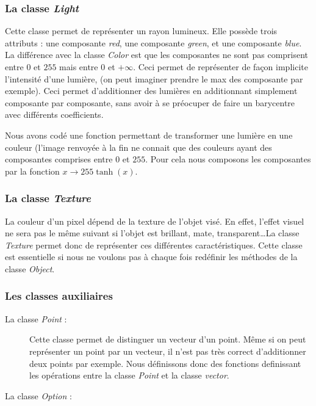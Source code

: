 \documentclass{article}
\begin{document}
\subsubsection{La classe \emph{Light}}
Cette classe permet de représenter un rayon lumineux. Elle possède trois attributs : une composante \emph{red}, une composante \emph{green}, et une composante \emph{blue}.
La différence avec la classe \emph{Color} est que les composantes ne sont pas comprisent entre $0$ et $255$ mais entre $0$ et $+\infty$.
Ceci permet de représenter de façon implicite l'intensité d'une lumière, (on peut imaginer prendre le max des composante par exemple). Ceci permet d'additionner des lumières en additionnant simplement composante par composante, sans avoir à se préocuper de faire un barycentre avec différents coefficients. 


Nous avons codé une fonction permettant de transformer une lumière en une couleur (l'image renvoyée à la fin ne connait que des couleurs ayant des composantes comprises entre $0$ et $255$. Pour cela nous composons les composantes par la fonction $x \rightarrow 255\tanh(x)$. 

\subsubsection{La classe \emph{Texture}}
	La couleur d'un pixel dépend de la texture de l'objet visé. En effet, l'effet visuel ne sera pas le même suivant si l'objet est brillant, mate, transparent\dots La classe \emph{Texture} permet donc de représenter ces différentes caractéristiques. Cette classe est essentielle si nous ne voulons pas à chaque fois redéfinir les méthodes de la classe \emph{Object}. 

\subsubsection{Les classes auxiliaires}
	\begin{description}
		\item[La classe \emph{Point} : ]
Cette classe permet de distinguer un vecteur d'un point. Même si on peut représenter un point par un vecteur, il n'est pas très correct d'additionner deux points par exemple. Nous définissons donc des fonctions definissant les opérations entre la classe \emph{Point} et la classe \emph{vector}.

		\item[La classe \emph{Option} : ]
	\end{description}
  
\end{document}
